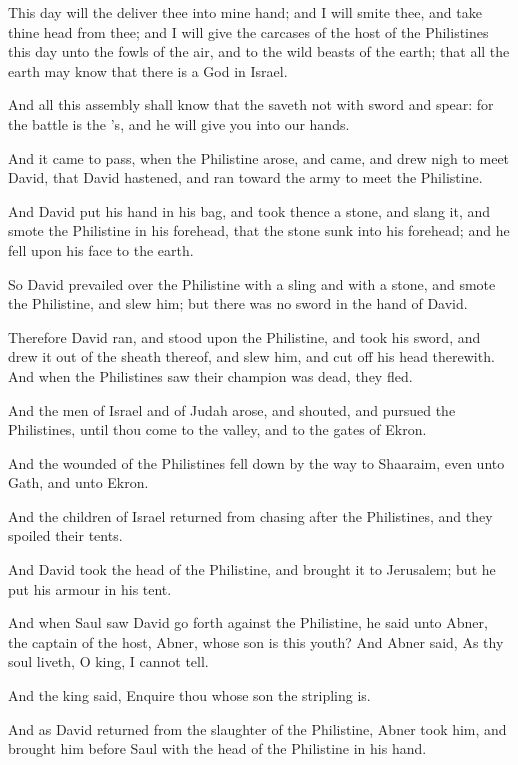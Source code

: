 \Verse This day will the \LORD deliver thee into mine hand; and I will smite thee, and take thine head from thee; and I will give the carcases of the host of the Philistines this day unto the fowls of the air, and to the wild beasts of the earth; that all the earth may know that there is a God in Israel.

\Verse And all this assembly shall know that the \LORD saveth not with sword and spear: for the battle is the \LORD's, and he will give you into our hands.

\Verse And it came to pass, when the Philistine arose, and came, and drew nigh to meet David, that David hastened, and ran toward the army to meet the Philistine.

\Verse And David put his hand in his bag, and took thence a stone, and slang it, and smote the Philistine in his forehead, that the stone sunk into his forehead; and he fell upon his face to the earth.

\Verse So David prevailed over the Philistine with a sling and with a stone, and smote the Philistine, and slew him; but there was no sword in the hand of David.

\Verse Therefore David ran, and stood upon the Philistine, and took his sword, and drew it out of the sheath thereof, and slew him, and cut off his head therewith. And when the Philistines saw their champion was dead, they fled.

\Verse And the men of Israel and of Judah arose, and shouted, and pursued the Philistines, until thou come to the valley, and to the gates of Ekron.

And the wounded of the Philistines fell down by the way to Shaaraim, even unto Gath, and unto Ekron.

\Verse And the children of Israel returned from chasing after the Philistines, and they spoiled their tents.

\Verse And David took the head of the Philistine, and brought it to Jerusalem; but he put his armour in his tent.

\Verse And when Saul saw David go forth against the Philistine, he said unto Abner, the captain of the host, Abner, whose son is this youth?  And Abner said, As thy soul liveth, O king, I cannot tell.

\Verse And the king said, Enquire thou whose son the stripling is.

\Verse And as David returned from the slaughter of the Philistine, Abner took him, and brought him before Saul with the head of the Philistine in his hand.

